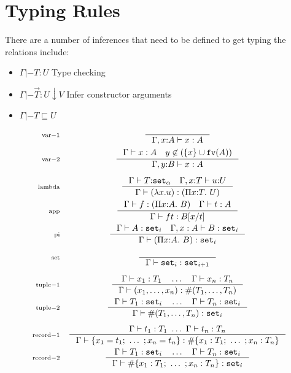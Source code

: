 \documentclass{article}
\newcommand{\rectyp}[1]{\#\{#1\}}
\newcommand{\recval}[1]{\{#1\}}
\newcommand{\fn}[1]{\mathtt{#1}}
\newcommand{\set}[1]{\fn{set}_{#1}}
\newcommand{\rctor}[3]{{#1} : {#2} \downarrow {#3}}
\newcommand{\Piexpr}[3]{\Pi {#1}{:}{#2}.\ {#3}}
\newcommand{\rlbl}[1]{\mathrm{\scriptstyle{}#1}}
\begin{document}
\section{Typing Rules}

There are a number of inferences that need to be defined to get typing the relations include:

\begin{itemize}
  \item $\Gamma |- T : U$ Type checking
  \item $\Gamma |- \rctor{\vec{T}}{U}{V}$ Infer constructor arguments
  \item $\Gamma |- T \sqsubseteq U$
\end{itemize}

\begin{gather*}
\begin{array}{rc}
\rlbl{var-1}&
\inference{}{\Gamma, x{:}A |- x : A}\\[1em]
\rlbl{var-2}&
\inference{\Gamma |- x : A \quad y \not\in (\{x\} \cup \fn{fv}(A))}
          {\Gamma,y{:}B |- x : A}\\[1.5em]
\rlbl{lambda}&
\inference{\Gamma |- T{:}\set{\alpha} \quad \Gamma,x{:}T |- u{:}U}
          {\Gamma |- (\lambda x . u) : (\Piexpr{x}{T}{U})}\\[1em]
\rlbl{app}&
\inference{\Gamma |- f : (\Piexpr{x}{A}{B}) \quad \Gamma |- t : A  }
          {\Gamma |- f t : B[x/t] }\\[1em]
\rlbl{pi}&
\inference{\Gamma |- A : \set{i} \quad \Gamma,x:A |- B : \set{i}}
          {\Gamma |- (\Piexpr{x}{A}{B}) : \set{i}}\\[1.5em]
\rlbl{set}&
\inference{}{\Gamma |- \set{i} : \set{i+1}}\\[1.5em]
\rlbl{tuple-1}&
\inference{\Gamma |- x_1 : T_1 \quad \dots \quad \Gamma |- x_n : T_n}
          {\Gamma |- (x_1, \dots, x_n) : \#(T_1, \dots, T_n)}\\[1em]
\rlbl{tuple-2}&
\inference{\Gamma |- T_1 : \set{i} \quad \dots \quad \Gamma |- T_n : \set{i}}
          {\Gamma |- \#(T_1, \dots, T_n) : \set{i}}\\[1.5em]
\rlbl{record-1}&
\inference{\Gamma |- t_1 : T_1\ \dots\ \Gamma |- t_n : T_n }
          {\Gamma |- \recval{ x_1 = t_1;\ \dots\ ; x_n = t_n} 
                   : \rectyp{ x_1 : T_1;\ \dots\ ; x_n : T_n}}\\[1em]
\rlbl{record-2}&
\inference{\Gamma |- T_1 : \set{i} \quad \dots \quad \Gamma |- T_n : \set{i}}
          {\Gamma |- \rectyp{ x_1 : T_1;\ \dots\ ; x_n : T_n} : \set{i}}\\[1em]

\end{array}
\end{gather*}
\end{document}
